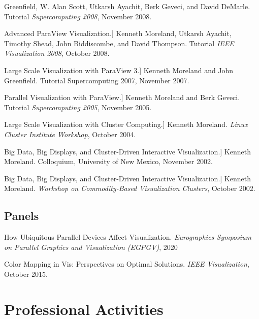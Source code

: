 \documentclass{article}
\begin{document}
\begin{enumerate}[label={[\arabic*]}]
  Greenfield, W. Alan Scott, Utkarsh Ayachit, Berk Geveci, and David
  DeMarle. Tutorial \emph{Supercomputing 2008}, November 2008.
\item Advanced ParaView Visualization.] Kenneth Moreland, Utkarsh
  Ayachit, Timothy Shead, John Biddiscombe, and David
  Thompson. Tutorial \emph{IEEE Visualization 2008}, October 2008.
\item Large Scale Visualization with ParaView 3.] Kenneth Moreland and
  John Greenfield. Tutorial Supercomputing 2007, November 2007.
\item Parallel Visualization with ParaView.] Kenneth Moreland and Berk
  Geveci. Tutorial \emph{Supercomputing 2005}, November 2005.
\item Large Scale Visualization with Cluster Computing.] Kenneth
  Moreland. \emph{Linux Cluster Institute Workshop}, October 2004.
\item Big Data, Big Displays, and Cluster-Driven Interactive
  Visualization.] Kenneth Moreland. Colloquium, University of New
  Mexico, November 2002.
\item Big Data, Big Displays, and Cluster-Driven Interactive
  Visualization.] Kenneth Moreland. \emph{Workshop on Commodity-Based
  Visualization Clusters}, October 2002.
\end{enumerate}


\subsection*{Panels}

\begin{enumerate}[label={[\arabic*]}]
\item How Ubiquitous Parallel Devices Affect Visualization.
  \emph{Eurographics Symposium on Parallel Graphics and Visualization (EGPGV)}, 2020
\item Color Mapping in Vis: Perspectives on Optimal Solutions.
  \emph{IEEE Visualization}, October 2015.
\end{enumerate}


\section*{Professional Activities}
\end{document}
